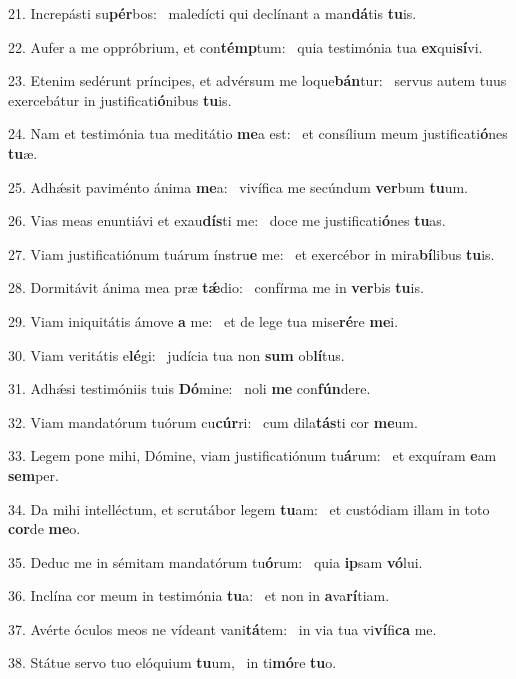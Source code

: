 21. Increpásti su\textbf{pér}bos: \ast\  maledícti qui declínant a man\textbf{dá}tis \textbf{tu}is.\

22. Aufer a me oppróbrium, et con\textbf{témp}tum: \ast\  quia testimónia tua \textbf{ex}qui\textbf{sí}vi.\

23. Etenim sedérunt príncipes, et advérsum me loque\textbf{bán}tur: \ast\  servus autem tuus exercebátur in justificati\textbf{ó}nibus \textbf{tu}is.\

24. Nam et testimónia tua meditátio \textbf{me}a est: \ast\  et consílium meum justificati\textbf{ó}nes \textbf{tu}æ.\

25. Adhǽsit paviménto ánima \textbf{me}a: \ast\  vivífica me secúndum \textbf{ver}bum \textbf{tu}um.\

26. Vias meas enuntiávi et exau\textbf{dís}ti me: \ast\  doce me justificati\textbf{ó}nes \textbf{tu}as.\

27. Viam justificatiónum tuárum ínstru\textbf{e} me: \ast\  et exercébor in mira\textbf{bí}libus \textbf{tu}is.\

28. Dormitávit ánima mea præ \textbf{tǽ}dio: \ast\  confírma me in \textbf{ver}bis \textbf{tu}is.\

29. Viam iniquitátis ámove \textbf{a} me: \ast\  et de lege tua mise\textbf{ré}re \textbf{me}i.\

30. Viam veritátis e\textbf{lé}gi: \ast\  judícia tua non \textbf{sum} ob\textbf{lí}tus.\

31. Adhǽsi testimóniis tuis \textbf{Dó}mine: \ast\  noli \textbf{me} con\textbf{fún}dere.\

32. Viam mandatórum tuórum cu\textbf{cúr}ri: \ast\  cum dila\textbf{tás}ti cor \textbf{me}um.\

33. Legem pone mihi, Dómine, viam justificatiónum tu\textbf{á}rum: \ast\  et exquíram \textbf{e}am \textbf{sem}per.\

34. Da mihi intelléctum, et scrutábor legem \textbf{tu}am: \ast\  et custódiam illam in toto \textbf{cor}de \textbf{me}o.\

35. Deduc me in sémitam mandatórum tu\textbf{ó}rum: \ast\  quia \textbf{ip}sam \textbf{vó}lui.\

36. Inclína cor meum in testimónia \textbf{tu}a: \ast\  et non in \textbf{a}va\textbf{rí}tiam.\

37. Avérte óculos meos ne vídeant vani\textbf{tá}tem: \ast\  in via tua vi\textbf{ví}fi\textbf{ca} me.\

38. Státue servo tuo elóquium \textbf{tu}um, \ast\  in ti\textbf{mó}re \textbf{tu}o.\

